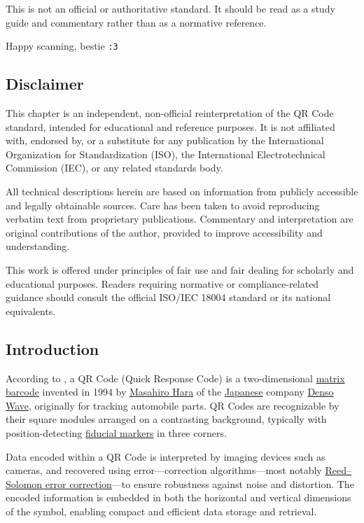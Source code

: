 \documentclass[../../2_codex]{subfiles}
\begin{document}
This is not an official or authoritative standard. It should be read as a study guide and commentary rather than as a normative reference.

Happy scanning, bestie \texttt{:3}

\subsection{Disclaimer}

This chapter is an independent, non-official reinterpretation of the QR Code standard, intended for educational and reference purposes. 
It is not affiliated with, endorsed by, or a substitute for any publication by the International Organization for Standardization (ISO), the International Electrotechnical Commission (IEC), or any related standards body.  

All technical descriptions herein are based on information from publicly accessible and legally obtainable sources.  Care has been taken to avoid reproducing verbatim text from proprietary publications.  Commentary and interpretation are original contributions of the author, provided to improve accessibility and understanding.  

This work is offered under principles of fair use and fair dealing for scholarly and educational purposes. Readers requiring normative or compliance-related guidance should consult the official ISO/IEC 18004 standard or its national equivalents.

\subsection{Introduction}

According to \textcite{wikipedia-qr}, a QR Code (Quick Response Code) is a two-dimensional \href{https://en.wikipedia.org/wiki/Barcode\#Matrix_(2D)_codes}{matrix
barcode} invented in 1994 by \href{https://en.wikipedia.org/wiki/Masahiro_Hara}{Masahiro Hara} of the \href{https://en.wikipedia.org/wiki/Japan}{Japanese} company \href{https://en.wikipedia.org/wiki/Denso\#DENSO_Wave}{Denso Wave}, originally for tracking automobile parts. 
QR Codes are recognizable by their square modules arranged on a contrasting background, typically with position-detecting \href{https://en.wikipedia.org/wiki/Fiducial_markers}{fiducial markers} in three corners.  

Data encoded within a QR Code is interpreted by imaging devices such as cameras, and recovered using error---correction algorithms—most notably \href{https://en.wikipedia.org/wiki/Reed\%E2\%80\%93Solomon_error_correction}{Reed--Solomon error correction}---to ensure robustness against noise and distortion. The encoded information is embedded in both the horizontal and vertical dimensions of the symbol, enabling compact and efficient data storage and retrieval.
\end{document}
